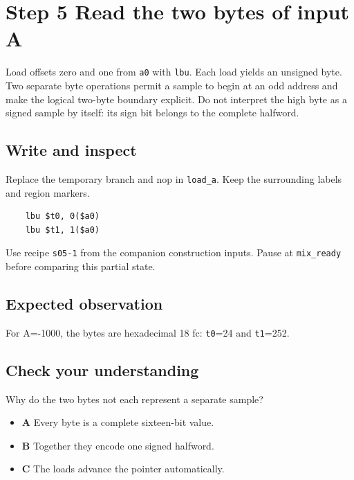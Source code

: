 \section{Step 5 Read the two bytes of input A}\label{pcm-s05}

Load offsets zero and one from \texttt{a0} with \texttt{lbu}. Each load yields an unsigned byte. Two separate byte operations permit a sample to begin at an odd address and make the logical two-byte boundary explicit. Do not interpret the high byte as a signed sample by itself: its sign bit belongs to the complete halfword.

\subsection{Write and inspect}
Replace the temporary branch and nop in \texttt{load\_a}. Keep the surrounding labels and region markers.

\begin{verbatim}
    lbu $t0, 0($a0)
    lbu $t1, 1($a0)
\end{verbatim}
Use recipe \texttt{s05-1} from the companion construction inputs. Pause at \texttt{mix\_ready} before comparing this partial state.

\subsection{Expected observation}
For A=-1000, the bytes are hexadecimal 18 fc: \texttt{t0}=24 and \texttt{t1}=252.

\subsection{Check your understanding}
Why do the two bytes not each represent a separate sample?

\begin{itemize}
\item \textbf{A} Every byte is a complete sixteen-bit value.
\item \textbf{B} Together they encode one signed halfword.
\item \textbf{C} The loads advance the pointer automatically.
\end{itemize}
